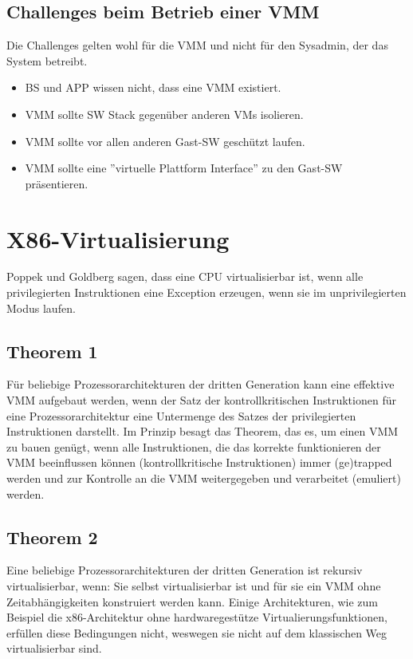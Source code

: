 \subsection{Challenges beim Betrieb einer VMM}
Die Challenges gelten wohl für die VMM und nicht für den Sysadmin, der das System betreibt.
\begin{itemize}
	\item BS und APP wissen nicht, dass eine VMM existiert.
	\item VMM sollte SW Stack gegenüber anderen VMs isolieren.
	\item VMM sollte vor allen anderen Gast-SW geschützt laufen.
	\item VMM sollte eine ''virtuelle Plattform Interface'' zu den Gast-SW präsentieren.
\end{itemize}

\newpage
\section{X86-Virtualisierung}
Poppek und Goldberg sagen, dass eine CPU virtualisierbar ist, wenn alle privilegierten Instruktionen eine Exception erzeugen, wenn sie im unprivilegierten Modus laufen.

\subsection{Theorem 1}
\label{sec:poppek-goldberg-theorem1}
Für beliebige Prozessorarchitekturen der dritten Generation kann
eine effektive VMM aufgebaut werden, wenn der Satz der
kontrollkritischen Instruktionen für eine Prozessorarchitektur
eine Untermenge des Satzes der privilegierten Instruktionen
darstellt.
Im Prinzip besagt das Theorem, das es, um einen VMM zu bauen
genügt, wenn alle Instruktionen, die das korrekte funktionieren
der VMM beeinflussen können (kontrollkritische Instruktionen)
immer (ge)trapped werden und zur Kontrolle an die VMM
weitergegeben und verarbeitet (emuliert) werden.

\subsection{Theorem 2}
Eine beliebige Prozessorarchitekturen der dritten Generation ist
rekursiv virtualisierbar, wenn: Sie selbst virtualisierbar ist und für sie ein VMM ohne Zeitabhängigkeiten konstruiert werden
kann.
Einige Architekturen, wie zum Beispiel die x86-Architektur ohne
hardwaregestütze Virtualierungsfunktionen, erfüllen diese
Bedingungen nicht, weswegen sie nicht auf dem klassischen Weg
virtualisierbar sind.

